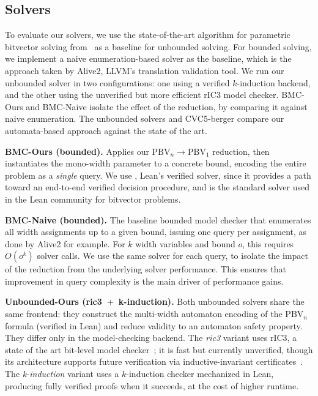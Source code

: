 \subsection{Solvers}

To evaluate our solvers, we use the state-of-the-art algorithm for parametric bitvector solving from~\citet{bit-precise-parametric-bv} as a baseline for unbounded solving.
For bounded solving, we implement a naive enumeration-based solver as the baseline, which is the approach taken by Alive2, LLVM's translation validation tool.
We run our unbounded solver in two configurations: one using a verified $k$-induction backend, and the other using the unverified but more efficient rIC3 model checker.
BMC-Ours and BMC-Naive isolate the effect of the reduction, by comparing it against naive enumeration.
The unbounded solvers and CVC5-berger compare our automata-based approach against the state of the art.

\noindent\textbf{BMC-Ours (bounded).}
Applies our $\text{PBV}_n \to \text{PBV}_1$ reduction, then instantiates the
mono-width parameter to a concrete bound, encoding the entire problem as a
\emph{single} \qfbv{} query. We use \bvdecide{}, Lean's verified \qfbv{} solver,
since it provides a path toward an end-to-end verified decision procedure,
and is the standard solver used in the Lean community for bitvector problems.

\noindent\textbf{BMC-Naive (bounded).}
The baseline bounded model checker that enumerates all width assignments up to a given bound,
issuing one \qfbv{} query per assignment, as done by Alive2 for example.
For $k$ width variables and bound $o$, this requires $O(o^k)$ solver calls.
We use the same \bvdecide{} solver for each query, to isolate the impact of the reduction from the underlying solver performance.
This ensures that improvement in query complexity is the main driver of performance gains.

\noindent\textbf{Unbounded-Ours (ric3~$+$~k-induction).}
Both unbounded solvers share the same frontend: they construct the multi-width automaton
encoding of the $\text{PBV}_n$ formula (verified in Lean) and reduce validity to an
automaton safety property. They differ only in the model-checking backend.
The \emph{ric3} variant uses rIC3, a state of the art bit-level model checker~\cite{ric3};
it is fast but currently unverified, though its architecture supports future verification
via inductive-invariant certificates~\cite{hwmcc_certs}.
The \emph{k-induction} variant uses a $k$-induction checker mechanized in Lean,
producing fully verified proofs when it succeeds, at the cost of higher runtime.

